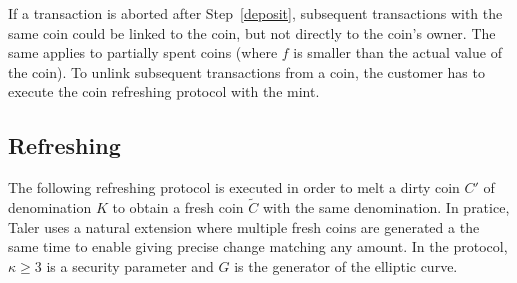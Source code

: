 \documentclass{llncs}
\begin{document}
If a transaction is aborted after Step~\ref{deposit},
subsequent transactions with the same coin could be linked to the coin,
but not directly to the coin's owner.  The same applies to partially
spent coins (where $f$ is smaller than the actual value of the coin).
To unlink subsequent transactions from a coin, the customer has to
execute the coin refreshing protocol with the mint.

%
%
%


\subsection{Refreshing} \label{sec:refreshing}

The following refreshing protocol is executed in order to melt a dirty
coin $C'$ of denomination $K$ to obtain a fresh coin $\widetilde{C}$
with the same denomination.  In pratice, Taler uses a natural
extension where multiple fresh coins are generated a the same time to
enable giving precise change matching any amount.  In the
protocol, $\kappa \ge 3$ is a security parameter and $G$ is the
generator of the elliptic curve.
\end{document}
